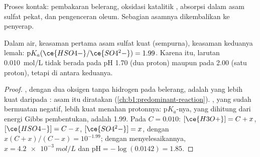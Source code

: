 \begin{omfigure}

{\small Proses kontak: pembakaran belerang, oksidasi katalitik ,
absorpsi  dalam asam sulfat pekat, dan pengenceran oleum.
Sebagian asamnya dikembalikan ke penyerap.}
\end{omfigure}

\begin{proposition}\label{prop:b1:p-block-16-18:sulfuric-strength}
Dalam air, keasaman pertama asam sulfat kuat (sempurna), keasaman
keduanya lemah: $\mathrm{p}K_a(\ce{HSO4-}/\ce{SO4^2-}) = 1.99$. Karena itu,
larutan \qty{0.010}{mol/L} tidak berada pada pH 1.70 (dua proton) maupun
pada 2.00 (satu proton), tetapi di antara keduanya.
\end{proposition}

\begin{proof}
, dengan dua oksigen tanpa hidrogen pada belerang, adalah  yang lebih kuat daripada : asam itu diratakan
(\cref{ch:b1:predominant-reaction}). , yang sudah bermuatan
negatif, lebih kuat menahan protonnya: $\mathrm{p}K_a$-nya, yang dihitung
dari energi Gibbs pembentukan, adalah 1.99. Pada $C = 0.010$:
$[\ce{H3O+}] = C + x$, $[\ce{HSO4-}] = C - x$, $[\ce{SO4^2-}] = x$, dengan
$x(C + x)/(C - x) = 10^{-1.99}$; dengan menyelesaikannya, $x = \qty{4.2e-3}{mol/L}$ dan
$\mathrm{pH} = -\log(0.0142) = 1.85$.
\end{proof}

